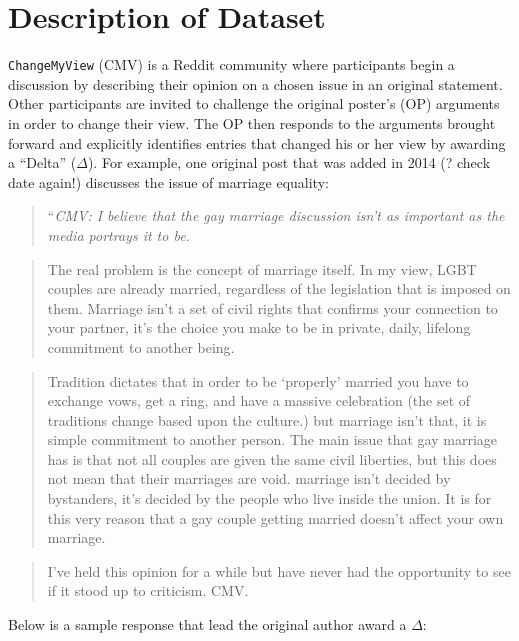 \documentclass[12pt,]{article}
\begin{document}
\section{Description of Dataset}\label{description-of-dataset}

\texttt{ChangeMyView} (CMV) is a Reddit community where participants
begin a discussion by describing their opinion on a chosen issue in an
original statement. Other participants are invited to challenge the
original poster's (OP) arguments in order to change their view. The OP
then responds to the arguments brought forward and explicitly identifies
entries that changed his or her view by awarding a ``Delta''
(\(\Delta\)). For example, one original post that was added in 2014 (?
check date again!) discusses the issue of marriage equality:

\begin{quote}
``\emph{CMV: I believe that the gay marriage discussion isn't as
important as the media portrays it to be.}
\end{quote}

\begin{quote}
The real problem is the concept of marriage itself. In my view, LGBT
couples are already married, regardless of the legislation that is
imposed on them. Marriage isn't a set of civil rights that confirms your
connection to your partner, it's the choice you make to be in private,
daily, lifelong commitment to another being.
\end{quote}

\begin{quote}
Tradition dictates that in order to be `properly' married you have to
exchange vows, get a ring, and have a massive celebration (the set of
traditions change based upon the culture.) but marriage isn't that, it
is simple commitment to another person. The main issue that gay marriage
has is that not all couples are given the same civil liberties, but this
does not mean that their marriages are void. marriage isn't decided by
bystanders, it's decided by the people who live inside the union. It is
for this very reason that a gay couple getting married doesn't affect
your own marriage.
\end{quote}

\begin{quote}
I've held this opinion for a while but have never had the opportunity to
see if it stood up to criticism. CMV.
\end{quote}

Below is a sample response that lead the original author award a
\(\Delta\):
\end{document}
